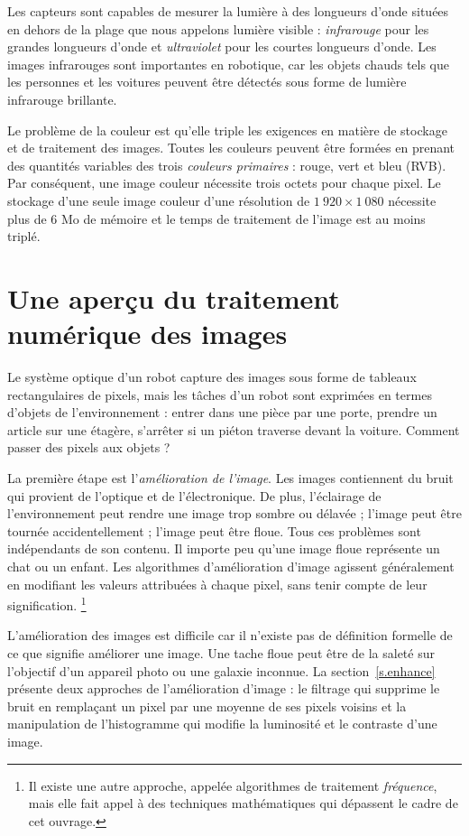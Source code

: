 Les capteurs sont capables de mesurer la lumière à des longueurs d'onde situées en dehors de la plage que nous appelons lumière visible : \emph{infrarouge} pour les grandes longueurs d'onde et \emph{ultraviolet} pour les courtes longueurs d'onde. Les images infrarouges sont importantes en robotique, car les objets chauds tels que les personnes et les voitures peuvent être détectés sous forme de lumière infrarouge brillante.

Le problème de la couleur est qu'elle triple les exigences en matière de stockage et de traitement des images. Toutes les couleurs peuvent être formées en prenant des quantités variables des trois \emph{couleurs primaires} : rouge, vert et bleu (RVB). Par conséquent, une image couleur nécessite trois octets pour chaque pixel. Le stockage d'une seule image couleur d'une résolution de $1\:920 \times 1\:080$ nécessite plus de $6$ Mo de mémoire et le temps de traitement de l’image est au moins triplé.

\section{Une aperçu du traitement numérique des images}\label{s.image-overview}

Le système optique d'un robot capture des images sous forme de tableaux rectangulaires de pixels, mais les tâches d'un robot sont exprimées en termes d'objets de l'environnement : entrer dans une pièce par une porte, prendre un article sur une étagère, s'arrêter si un piéton traverse devant la voiture. Comment passer des pixels aux objets ?

La première étape est l'\emph{amélioration de l'image}. Les images contiennent du bruit qui provient de l'optique et de l'électronique. De plus, l'éclairage de l'environnement peut rendre une image trop sombre ou délavée ; l'image peut être tournée accidentellement ; l'image peut être floue. Tous ces problèmes sont indépendants de son contenu. Il importe peu qu'une image floue représente un chat ou un enfant. Les algorithmes d'amélioration d'image agissent généralement en modifiant les valeurs attribuées à chaque pixel, sans tenir compte de leur signification. \footnote{Il existe une autre approche, appelée algorithmes de traitement \emph{fréquence}, mais elle fait appel à des techniques mathématiques qui dépassent le cadre de cet ouvrage.}

L'amélioration des images est difficile car il n'existe pas de définition formelle de ce que signifie améliorer une image. Une tache floue peut être de la saleté sur l'objectif d'un appareil photo ou une galaxie inconnue. La section~\ref{s.enhance} présente deux approches de l'amélioration d'image : le filtrage qui supprime le bruit en remplaçant un pixel par une moyenne de ses pixels voisins et la manipulation de l'histogramme qui modifie la luminosité et le contraste d'une image.

